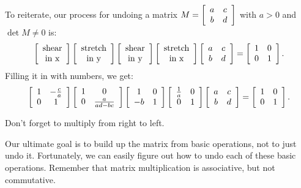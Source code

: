 \documentclass[../gatm.tex]{subfiles}
\begin{document}
\noindent To reiterate, our process for undoing a matrix $M=\left[\begin{array}{cc} a & c \\ b & d \end{array}\right]$ with $a>0$ and $\det M\neq 0$ is:
$$\left[\begin{array}{c}\text{shear} \\ \text{in x}\end{array}\right]
\left[\begin{array}{c}\text{stretch} \\ \text{in y}\end{array}\right]
\left[\begin{array}{c}\text{shear} \\ \text{in y}\end{array}\right]
\left[\begin{array}{c}\text{stretch} \\ \text{in x}\end{array}\right]
\left[\begin{array}{cc} a & c \\ b & d \end{array}\right]=\left[\begin{array}{cc} 1 & 0 \\ 0 & 1 \end{array}\right].$$
Filling it in with numbers, we get:
$$\left[\begin{array}{cc} 1 & -\frac{c}{a} \\ 0 & 1 \end{array}\right]\left[\begin{array}{cc} 1 & 0 \\ 0 & \frac{a}{ad-bc} \end{array}\right]\left[\begin{array}{cc} 1 & 0 \\ -b & 1 \end{array}\right]\left[\begin{array}{cc} \frac{1}{a} & 0 \\ 0 & 1 \end{array}\right]\left[\begin{array}{cc} a & c \\ b & d \end{array}\right]=\left[\begin{array}{cc} 1 & 0 \\ 0 & 1 \end{array}\right].$$ \label{prob:list_of_matrices}

\noindent Don't forget to multiply from right to left.

Our ultimate goal is to build up the matrix from basic operations, not to just undo it. Fortunately, we can easily figure out how to undo each of these basic operations. Remember that matrix multiplication is associative, but not commutative.
\end{document}
